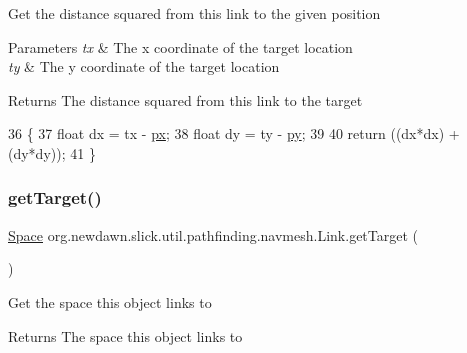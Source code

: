 Get the distance squared from this link to the given position


\begin{DoxyParams}{Parameters}
{\em tx} & The x coordinate of the target location \\
\hline
{\em ty} & The y coordinate of the target location \\
\hline
\end{DoxyParams}
\begin{DoxyReturn}{Returns}
The distance squared from this link to the target 
\end{DoxyReturn}

\begin{DoxyCode}
36                                                \{
37         \textcolor{keywordtype}{float} dx = tx - \mbox{\hyperlink{classorg_1_1newdawn_1_1slick_1_1util_1_1pathfinding_1_1navmesh_1_1_link_a83c2e5065b4ed17f607670d6d295bdb0}{px}};
38         \textcolor{keywordtype}{float} dy = ty - \mbox{\hyperlink{classorg_1_1newdawn_1_1slick_1_1util_1_1pathfinding_1_1navmesh_1_1_link_afeb36f879009f5cda66275dd065dfdf2}{py}};
39         
40         \textcolor{keywordflow}{return} ((dx*dx) + (dy*dy));
41     \}
\end{DoxyCode}
\mbox{\label{classorg_1_1newdawn_1_1slick_1_1util_1_1pathfinding_1_1navmesh_1_1_link_aeb76f2571abc64ff370e14ea6c16dd62}} 
\subsubsection{\texorpdfstring{get\+Target()}{getTarget()}}
{\footnotesize\ttfamily \mbox{\hyperlink{classorg_1_1newdawn_1_1slick_1_1util_1_1pathfinding_1_1navmesh_1_1_space}{Space}} org.\+newdawn.\+slick.\+util.\+pathfinding.\+navmesh.\+Link.\+get\+Target (\begin{DoxyParamCaption}{ }\end{DoxyParamCaption})\hspace{0.3cm}{\ttfamily [inline]}}

Get the space this object links to

\begin{DoxyReturn}{Returns}
The space this object links to 
\end{DoxyReturn}

